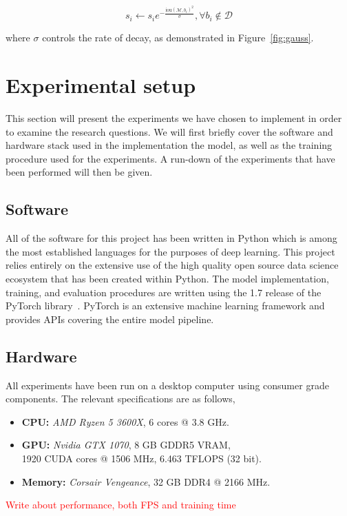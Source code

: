 \[s_i\leftarrow s_i e^{-\frac{\text{iou}{(\mathcal{M}, b_i)}^2}{\sigma}},\forall b_i \notin \mathcal{D}\]

where \( \sigma \) controls the rate of decay, as demonstrated in Figure~\ref{fig:gauss}.

\section{Experimental setup}\label{sec:method-exp-setup}
This section will present the experiments we have chosen to implement in order to examine the research questions.
We will first briefly cover the software and hardware stack used in the implementation the model, as well as the training procedure used for the experiments.
A run-down of the experiments that have been performed will then be given.

\subsection{Software}
All of the software for this project has been written in Python which is among the most established languages for the purposes of deep learning.
This project relies entirely on the extensive use of the high quality open source data science ecosystem that has been created within Python.
The model implementation, training, and evaluation procedures are written using the 1.7 release of the PyTorch library~\parencite{NEURIPS2019_9015}. PyTorch is an extensive machine learning framework and provides APIs covering the entire model pipeline.

\subsection{Hardware}
All experiments have been run on a desktop computer using consumer grade components.
The relevant specifications are as follows,
\begin{itemize}
  \item \textbf{CPU:} \textit{AMD Ryzen 5 3600X}, 6 cores @ 3.8 GHz.
  \item \textbf{GPU:} \textit{Nvidia GTX 1070}, 8 GB GDDR5 VRAM,\\1920 CUDA cores @ 1506 MHz, 6.463 TFLOPS (32 bit).
  \item \textbf{Memory:} \textit{Corsair Vengeance}, 32 GB DDR4 @ 2166 MHz.
\end{itemize}

\textcolor{red}{Write about performance, both FPS and training time}

